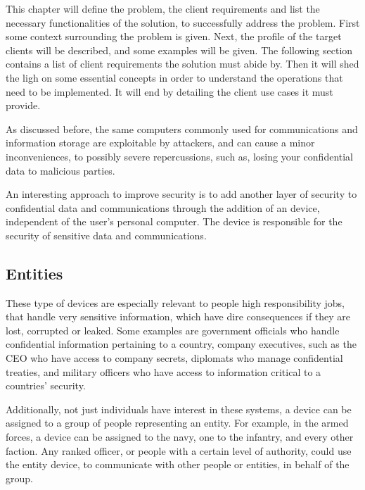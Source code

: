 \cleardoublepage
\label{chap:problem}

This chapter will define the problem, the client requirements and list the necessary functionalities of the solution, to successfully address the problem.
First some context surrounding the problem is given. 
Next, the profile of the target clients will be described, and some examples will be given.
The following section contains a list of client requirements the solution must abide by.
Then it will shed the ligh on some essential concepts in order to understand the operations that need to be implemented.
It will end by detailing the client use cases it must provide.

As discussed before, the same computers commonly used for communications and information storage are exploitable by attackers, and can cause a minor inconveniences, to possibly severe repercussions, such as, losing your confidential data to malicious parties.

An interesting approach to improve security is to add another layer of security to confidential data and communications through the addition of an device, independent of the user's personal computer. The device is responsible for the security of sensitive data and communications.


\subsection{Entities}\label{chap:problem:entities}

These type of devices are especially relevant to people high responsibility jobs, that handle very sensitive information, which have dire consequences if they are lost, corrupted or leaked.
Some examples are government officials who handle confidential information pertaining to a country, company executives, such as the CEO who have access to company secrets, diplomats who manage confidential treaties, and military officers who have access to information critical to a countries' security.

Additionally, not just individuals have interest in these systems, a device can be assigned to a group of people representing an entity. For example, in the armed forces, a device can be assigned to the navy, one to the infantry, and every other faction. Any ranked officer, or people with a certain level of authority, could use the entity device, to communicate with other people or entities, in behalf of the group.

